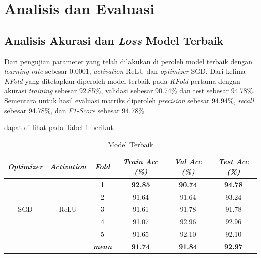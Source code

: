 \section{Analisis dan Evaluasi}
    \subsection{Analisis Akurasi dan \textit{Loss} Model Terbaik}

    Dari pengujian parameter yang telah dilakukan di peroleh model terbaik dengan \textit{learning rate} sebesar 0.0001, \textit{activation} ReLU dan \textit{optimizer} SGD. Dari kelima \textit{KFold} yang ditetapkan diperoleh model terbaik pada \textit{KFold} pertama dengan akurasi \textit{training} sebesar 92.85\%, validasi sebesar 90.74\% dan test sebesar 94.78\%. Sementara untuk hasil evaluasi matriks diperoleh \textit{precision} sebesar 94.94\%, \textit{recall} sebesar 94.78\%, dan \textit{F1-Score} sebesar 94.78\%
    
    
    
    dapat di lihat pada Tabel \ref{Model Terbaik} berikut.

    \begin{table}[H]
        \centering
        \caption{Model Terbaik}
        \begin{tabular}{cccccc}
            \toprule
            \textbf{\textit{Optimizer}} & \textbf{\textit{Activation}} &
            \multicolumn{1}{c}{\textit{\textbf{Fold}}} & \textbf{\textit{Train Acc (\%) } } & \textbf{\textit{Val Acc (\%)}} & \textbf{\textit{Test Acc (\%)}}\\
        
            \midrule
            \multirow{5}{*}{SGD} & \multirow{5}{*}{ReLU} 
            & \textbf{1} & \textbf{92.85 }& \textbf{90.74 }& \textbf{94.78} \\
            & & 2 & 91.64 & 91.64 & 93.24 \\
            & & 3 & 91.61 & 91.78 & 91.78 \\
            & & 4 & 91.07 & 92.96 & 92.96 \\
            & & 5 & 91.65 & 92.10 & 92.10  \\
            & &\multirow{1}{*}{\textit{\textbf{mean}}} & \textbf{91.74} & \textbf{91.84} &\textbf{92.97} \\ 
            \bottomrule
        \end{tabular}
        \label{Model Terbaik}
    \end{table}


